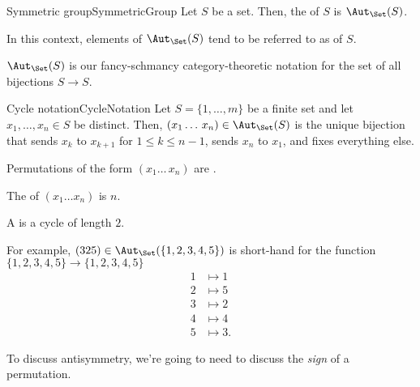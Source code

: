 \begin{dfn}{Symmetric group}{SymmetricGroup}
	Let $S$ be a set.  Then, the  of $S$ is $\Aut _{\Set}(S)$.
	\begin{rmk}
		In this context, elements of $\Aut _{\Set}(S)$ tend to be referred to as  of $S$.
	\end{rmk}
	\begin{rmk}
		$\Aut _{\Set}(S)$ is our fancy-schmancy category-theoretic notation for the set of all bijections $S\rightarrow S$.
	\end{rmk}
\end{dfn}
\begin{dfn}{Cycle notation}{CycleNotation}
	Let $S=\{ 1,\ldots ,m\}$ be a finite set and let $x_1,\ldots ,x_n\in S$ be distinct.  Then, $(x_1\ldots \, x_n)\in \Aut _{\Set}(S)$ is the unique bijection that sends $x_k$ to $x_{k+1}$ for $1\leq k\leq n-1$, sends $x_n$ to $x_1$, and fixes everything else.
	\begin{rmk}
		Permutations of the form $(x_1\ldots \, x_n)$ are \index{Cycle}.
	\end{rmk}
	\begin{rmk}
		The  of $(x_1\ldots x_n)$ is $n$.
	\end{rmk}
	\begin{rmk}
		A  is a cycle of length $2$.
	\end{rmk}
	\begin{rmk}
		For example, $(325)\in \Aut _{\Set}(\{ 1,2,3,4,5\} )$ is short-hand for the function $\{ 1,2,3,4,5\} \rightarrow \{ 1,2,3,4,5\}$
		\begin{subequations}
			\begin{align}
				1 & \mapsto 1 \\
				2 & \mapsto 5 \\
				3 & \mapsto 2 \\
				4 & \mapsto 4 \\
				5 & \mapsto 3.
			\end{align}
		\end{subequations}
	\end{rmk}
\end{dfn}
To discuss antisymmetry, we're going to need to discuss the \emph{sign} of a permutation.
